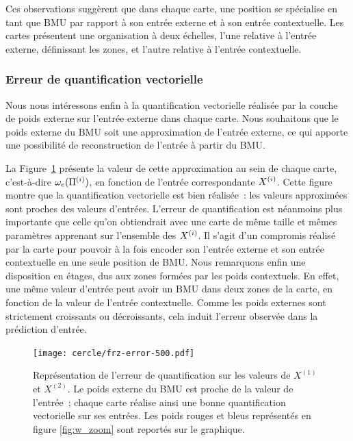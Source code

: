 \documentclass[../main]{subfiles}
\begin{document}
Ces observations suggèrent que dans chaque carte, une position se spécialise en tant que BMU par rapport à son entrée externe et à son entrée contextuelle. 
Les cartes présentent une organisation à deux échelles, l'une relative à l'entrée externe, définissant les zones, et l'autre relative à l'entrée contextuelle.

\subsubsection{Erreur de quantification vectorielle}

Nous nous intéressons enfin à la quantification vectorielle réalisée par la couche de poids externe sur l'entrée externe dans chaque carte. 
Nous souhaitons que le poids externe du BMU soit une approximation de l'entrée externe, ce qui apporte une possibilité de reconstruction de l'entrée à partir du BMU.

La Figure~\ref{fig:qv} présente la valeur de cette approximation au sein de chaque carte, c'est-à-dire $\omega_{e}(\Pi^{({i})})$, en fonction de l'entrée correspondante $X^{({i})}$. 
Cette figure montre que la quantification vectorielle est bien réalisée~: les valeurs approximées sont proches des valeurs d'entrées.
L'erreur de quantification est néanmoins plus importante que celle qu'on obtiendrait avec une carte de même taille et mêmes paramètres apprenant sur l'ensemble des $X^{({i})}$. Il s'agit d'un compromis réalisé par la carte pour pouvoir à la fois encoder son l'entrée externe et son entrée contextuelle en une seule position de BMU.
Nous remarquons enfin une disposition en étages, dus aux zones formées par les poids contextuels.
En effet, une même valeur d'entrée peut avoir un BMU dans deux zones de la carte, en fonction de la valeur de l'entrée contextuelle. 
Comme les poids externes sont strictement croissants ou décroissants, cela induit l'erreur observée dans la prédiction d'entrée.

\begin{figure}[h!]
	\centering\texttt{[image: cercle/frz-error-500.pdf]}
	\caption{Représentation de l'erreur de quantification sur les valeurs de $X^{(1)}$ et $X^{(2)}$. Le poids externe du BMU est proche de la valeur de l'entrée~; chaque carte réalise ainsi une bonne quantification vectorielle sur ses entrées. 
	Les poids rouges et bleus représentés en figure \ref{fig:w_zoom} sont reportés sur le graphique. \label{fig:qv}}
\end{figure}
\end{document}
